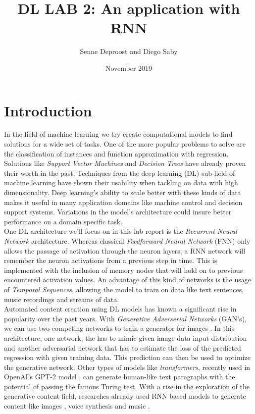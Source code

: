\documentclass[11pt]
{article}
\title{DL LAB 2: An application with RNN}
\author{Senne Deproost and Diego Saby}
\date{November 2019}
\begin{document}
\maketitle
\section{Introduction}
In the field of machine learning we try create computational models to find solutions for a wide set of tasks. One of the more popular problems to solve are the classification of instances and function approximation with regression. Solutions like \textit{Support Vector Machines} and \textit{Decision Trees} have already proven their worth in the past. Techniques from the deep learning (DL) sub-field of machine learning have shown their usability when tackling on data with high dimen\-sionality. Deep learning's ability to scale better with these kinds of data makes it useful in many application domains like machine control and decision support systems. Variations in the model's architecture could insure better performance on a domain specific task.\\

One DL architecture we'll focus on in this lab report is the \textit{Recurrent Neural Network} architecture. Whereas classical \textit{Feedforward Neural Network} (FNN) only allows the passage of activation through the neuron layers, a RNN network will remember the neuron activations from a previous step in time. This is implemented with the inclusion of memory nodes that will hold on to previous encountered activation values. An advantage of this kind of networks is the usage of \textit{Temporal Sequences}, allowing the model to train on data like text sentences, music recordings and streams of data.\\

Automated content creation using DL models has known a significant rise in popularity over the past years. With \textit{Generative Adverserial Networks} (GAN's), we can use two competing networks to train a generator for images \cite{Goodfellow2014}. In this architecture, one network, the has to mimic given image data input distribution and another adversarial network that has to estimate the loss of the predicted regression with given training data. This prediction can then be used to optimize the generative network. Other types of models like \textit{transformers}, recently used in OpenAI's GPT-2 model \cite{Radford}, can generate human-like text paragraphs with the potential of passing the famous Turing test. With a rise in the exploration of the generative content field, researches already used RNN based models to generate content like images \cite{Gregor}, voice synthesis \cite{Oord2016,VanDenOord2016} and music \cite{Oord2016}.\\
\end{document}

